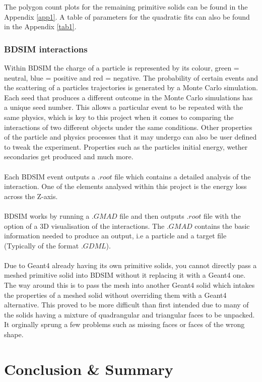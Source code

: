 \documentclass[12pt,a4paper]{article}
\begin{document}
\noindent The polygon count plots for the remaining primitive solids can be found in the Appendix \ref{app1}. A table of parameters for the quadratic fits can also be found in the Appendix \ref{tab1}. 
\newpage
\subsubsection{BDSIM interactions}
Within BDSIM the charge of a particle is represented by its colour, green = neutral, blue = positive and red = negative. The probability of certain events and the scattering of a particles trajectories is generated by a Monte Carlo simulation. Each seed that produces a different outcome in the Monte Carlo simulations has a unique seed number. This allows a particular event to be repeated with the same physics, which is key to this project when it comes to comparing the interactions of two different objects under the same conditions. Other properties of the particle and physics processes that it may undergo can also be user defined to tweak the experiment. Properties such as the particles initial energy, wether secondaries get produced and much more.
\\\\
Each BDSIM event outputs a $.root$ file which contains a detailed analysis of the interaction. One of the elements analysed within this project is the energy loss across the Z-axis.
\\\\
BDSIM works by running a $.GMAD$ file and then outputs $.root$ file with the option of a 3D visualisation of the interactions. The $.GMAD$ contains the basic information needed to produce an output, i.e a particle and a target file (Typically of the format $.GDML$).
\\\\
Due to Geant4 already having its own primitive solids, you cannot directly pass a meshed primitive solid into BDSIM without it replacing it with a Geant4 one. The way around this is to pass the mesh into another Geant4 solid which intakes the properties of a meshed solid without overriding them with a Geant4 alternative. This proved to be more difficult than first intended due to many of the solids having a mixture of quadrangular and triangular faces to be unpacked. It orginally sprung a few problems such as missing faces or faces of the wrong shape. 

\newpage
\section{Conclusion \& Summary}
\label{conc}
\end{document}
